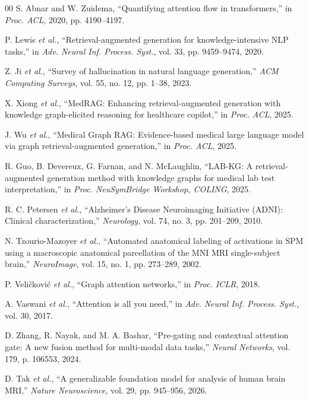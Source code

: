 \documentclass[conference]{IEEEtran}
\begin{document}
\begin{thebibliography}{00}
 S. Abnar and W. Zuidema, ``Quantifying attention flow in transformers,'' in \textit{Proc. ACL}, 2020, pp. 4190--4197.

 P. Lewis \textit{et al.}, ``Retrieval-augmented generation for knowledge-intensive NLP tasks,'' in \textit{Adv. Neural Inf. Process. Syst.}, vol. 33, pp. 9459--9474, 2020.

 Z. Ji \textit{et al.}, ``Survey of hallucination in natural language generation,'' \textit{ACM Computing Surveys}, vol. 55, no. 12, pp. 1--38, 2023.

 X. Xiong \textit{et al.}, ``MedRAG: Enhancing retrieval-augmented generation with knowledge graph-elicited reasoning for healthcare copilot,'' in \textit{Proc. ACL}, 2025.

 J. Wu \textit{et al.}, ``Medical Graph RAG: Evidence-based medical large language model via graph retrieval-augmented generation,'' in \textit{Proc. ACL}, 2025.

 R. Guo, B. Devereux, G. Farnan, and N. McLaughlin, ``LAB-KG: A retrieval-augmented generation method with knowledge graphs for medical lab test interpretation,'' in \textit{Proc. NeuSymBridge Workshop, COLING}, 2025.

 R. C. Petersen \textit{et al.}, ``Alzheimer's Disease Neuroimaging Initiative (ADNI): Clinical characterization,'' \textit{Neurology}, vol. 74, no. 3, pp. 201--209, 2010.

 N. Tzourio-Mazoyer \textit{et al.}, ``Automated anatomical labeling of activations in SPM using a macroscopic anatomical parcellation of the MNI MRI single-subject brain,'' \textit{NeuroImage}, vol. 15, no. 1, pp. 273--289, 2002.

 P. Veli\v{c}kovi\'{c} \textit{et al.}, ``Graph attention networks,'' in \textit{Proc. ICLR}, 2018.

 A. Vaswani \textit{et al.}, ``Attention is all you need,'' in \textit{Adv. Neural Inf. Process. Syst.}, vol. 30, 2017.

 D. Zhang, R. Nayak, and M. A. Bashar, ``Pre-gating and contextual attention gate: A new fusion method for multi-modal data tasks,'' \textit{Neural Networks}, vol. 179, p. 106553, 2024.

 D. Tak \textit{et al.}, ``A generalizable foundation model for analysis of human brain MRI,'' \textit{Nature Neuroscience}, vol. 29, pp. 945--956, 2026.


\end{thebibliography}
\end{document}
